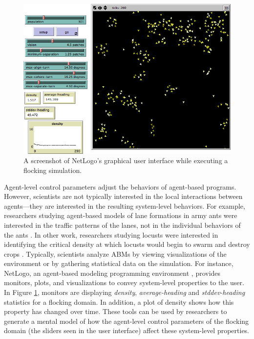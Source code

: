 \begin{figure}[ht]
\centering
\includegraphics[scale=.5]{images/netlogoui.png}
\caption{A screenshot of NetLogo's graphical user interface while executing a flocking simulation.}
\label{fig:netlogoui}
\end{figure}

Agent-level control parameters adjust the behaviors of agent-based programs.
However, scientists are not typically interested in the local interactions between agents---they are interested in the resulting system-level behaviors.
For example, researchers studying agent-based models of lane formations in army ants were interested in the traffic patterns of the lanes, not in the individual behaviors of the ants \cite{couzin2003sol}.
In other work, researchers studying locusts were interested in identifying the critical density at which locusts would begin to swarm and destroy crops \cite{buhl2006dom}.
Typically, scientists analyze ABMs by viewing visualizations of the environment or by gathering statistical data on the simulation.
For instance, NetLogo, an agent-based modeling programming environment \cite{tisue2004netlogo}, provides monitors, plots, and visualizations to convey system-level properties to the user.
In Figure \ref{fig:netlogoui}, monitors are displaying \textit{density}, \textit{average-heading} and \textit{stddev-heading} statistics for a flocking domain.
In addition, a plot of density shows how this property has changed over time.
These tools can be used by researchers to generate a mental model of how the agent-level control parameters of the flocking domain (the sliders seen in the user interface) affect these system-level properties.

